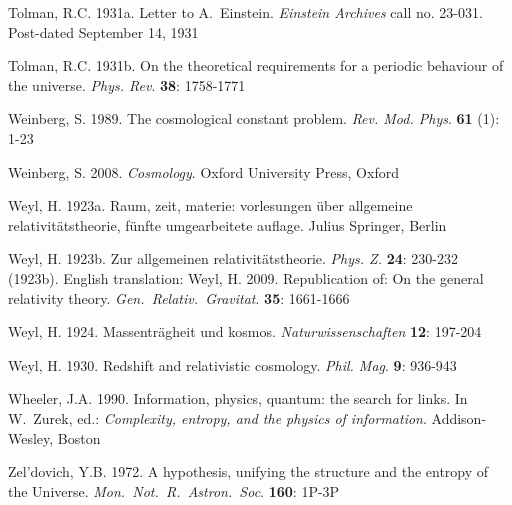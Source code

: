 \documentclass[12 pt]{article}
\begin{document}
\begin{thebibliography}{}
 Tolman, R.C. 1931a. Letter to A.\ Einstein. \textit{Einstein Archives} call no. 23-031. Post-dated September 14, 1931

 Tolman, R.C. 1931b. On the theoretical requirements for a periodic behaviour of the universe. \textit{Phys. Rev}. \textbf{38}: 1758-1771

 Weinberg, S. 1989. The cosmological constant problem. \textit{Rev. Mod. Phys}. \textbf{61} (1): 1-23

 Weinberg, S. 2008. \textit{Cosmology}. Oxford University Press, Oxford

 Weyl, H. 1923a. Raum, zeit, materie: vorlesungen \"{u}ber allgemeine relativit\"{a}tstheorie, f\"{u}nfte umgearbeitete auflage. Julius Springer, Berlin

 Weyl, H. 1923b. Zur allgemeinen relativit\"{a}tstheorie. \textit{Phys. Z.} \textbf{24}: 230-232 (1923b). English translation: Weyl, H. 2009. Republication of: On the general relativity theory. \textit{Gen.\ Relativ.\ Gravitat}. \textbf{35}: 1661-1666

 Weyl, H. 1924. Massentr\"{a}gheit und kosmos. \textit{Naturwissenschaften} \textbf{12}: 197-204

 Weyl, H. 1930. Redshift and relativistic cosmology. \textit{Phil. Mag}. \textbf{9}: 936-943

 Wheeler, J.A. 1990. Information, physics, quantum: the search for links. In W.\ Zurek, ed.: \textit{Complexity, entropy, and the physics of information}. Addison-Wesley, Boston

 Zel'dovich, Y.B. 1972. A hypothesis, unifying the structure and the entropy of the Universe. \textit{Mon.\ Not.\ R.\ Astron.\ Soc}. \textbf{160}: 1P-3P

\end{thebibliography}
\end{document}
